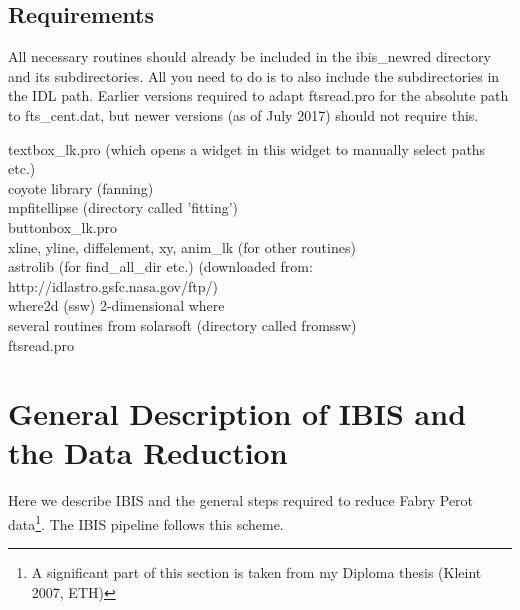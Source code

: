 \documentclass[a4paper,11pt]{article}
\begin{document}
\subsection{Requirements}

All necessary routines should already be included in the ibis\_newred directory and its subdirectories. All you need to do is to also include the subdirectories in the IDL path. Earlier versions required to adapt ftsread.pro for the absolute path to fts\_cent.dat, but newer versions (as of July 2017) should not require this.

textbox\_lk.pro (which opens a widget in this widget to manually
         select paths etc.) \\
          coyote library (fanning) \\
          mpfitellipse (directory called 'fitting') \\
          buttonbox\_lk.pro\\
          xline, yline, diffelement, xy, anim\_lk (for other routines)\\
          astrolib (for find\_all\_dir etc.) 
                       (downloaded from: http://idlastro.gsfc.nasa.gov/ftp/) \\
          where2d (ssw) 2-dimensional where\\
          several routines from solarsoft (directory called fromssw) \\
          ftsread.pro 

\newpage
\section{General Description of IBIS and the Data Reduction}
Here we describe IBIS and the general steps required to reduce Fabry Perot data\footnote{A significant part of this section is taken from my Diploma thesis (Kleint 2007, ETH)}. The IBIS pipeline follows this scheme.
\end{document}
